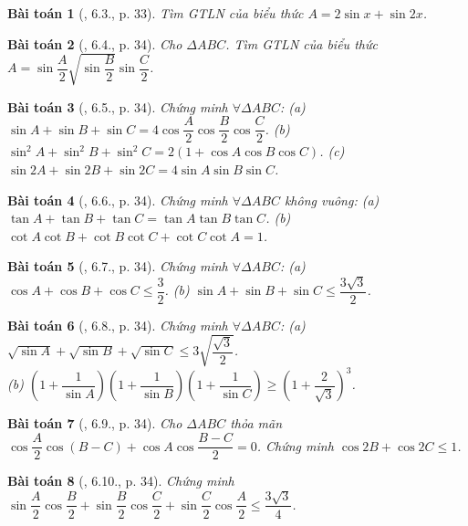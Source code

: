 \documentclass{article}
\newtheorem{baitoan}{Bài toán}
\begin{document}
\begin{baitoan}[\cite{Hung_nang_cao_phat_trien_Toan_11_tap_1}, 6.3., p. 33]
	Tìm {\rm GTLN} của biểu thức $A = 2\sin x + \sin2x$.
\end{baitoan}

\begin{baitoan}[\cite{Hung_nang_cao_phat_trien_Toan_11_tap_1}, 6.4., p. 34]
	Cho $\Delta ABC$. Tìm {\rm GTLN} của biểu thức $A = \sin\dfrac{A}{2}\sqrt{\sin\dfrac{B}{2}}\sin\dfrac{C}{2}$.
\end{baitoan}

\begin{baitoan}[\cite{Hung_nang_cao_phat_trien_Toan_11_tap_1}, 6.5., p. 34]
	Chứng minh $\forall\Delta ABC$: (a) $\sin A + \sin B + \sin C = 4\cos\dfrac{A}{2}\cos\dfrac{B}{2}\cos\dfrac{C}{2}$. (b) $\sin^2A + \sin^2B + \sin^2C = 2(1 + \cos A\cos B\cos C)$. (c) $\sin2A + \sin2B + \sin2C = 4\sin A\sin B\sin C$.
\end{baitoan}

\begin{baitoan}[\cite{Hung_nang_cao_phat_trien_Toan_11_tap_1}, 6.6., p. 34]
	Chứng minh $\forall\Delta ABC$ không vuông: (a) $\tan A + \tan B + \tan C = \tan A\tan B\tan C$. (b) $\cot A\cot B + \cot B\cot C + \cot C\cot A = 1$.
\end{baitoan}

\begin{baitoan}[\cite{Hung_nang_cao_phat_trien_Toan_11_tap_1}, 6.7., p. 34]
	Chứng minh $\forall\Delta ABC$: (a) $\cos A + \cos B + \cos C\le\dfrac{3}{2}$. (b) $\sin A + \sin B + \sin C\le\dfrac{3\sqrt{3}}{2}$.
\end{baitoan}

\begin{baitoan}[\cite{Hung_nang_cao_phat_trien_Toan_11_tap_1}, 6.8., p. 34]
	Chứng minh $\forall\Delta ABC$: (a) $\sqrt{\sin A} + \sqrt{\sin B} + \sqrt{\sin C}\le3\sqrt{\dfrac{\sqrt{3}}{2}}$.\\(b) $\left(1 + \dfrac{1}{\sin A}\right)\left(1 + \dfrac{1}{\sin B}\right)\left(1 + \dfrac{1}{\sin C}\right)\ge\left(1 + \dfrac{2}{\sqrt{3}}\right)^3$.
\end{baitoan}

\begin{baitoan}[\cite{Hung_nang_cao_phat_trien_Toan_11_tap_1}, 6.9., p. 34]
	Cho $\Delta ABC$ thỏa mãn $\cos\dfrac{A}{2}\cos(B - C) + \cos A\cos\dfrac{B - C}{2} = 0$. Chứng minh $\cos2B + \cos2C\le1$.
\end{baitoan}

\begin{baitoan}[\cite{Hung_nang_cao_phat_trien_Toan_11_tap_1}, 6.10., p. 34]
	Chứng minh $\sin\dfrac{A}{2}\cos\dfrac{B}{2} + \sin\dfrac{B}{2}\cos\dfrac{C}{2} + \sin\dfrac{C}{2}\cos\dfrac{A}{2}\le\dfrac{3\sqrt{3}}{4}$.
\end{baitoan}
\end{document}
